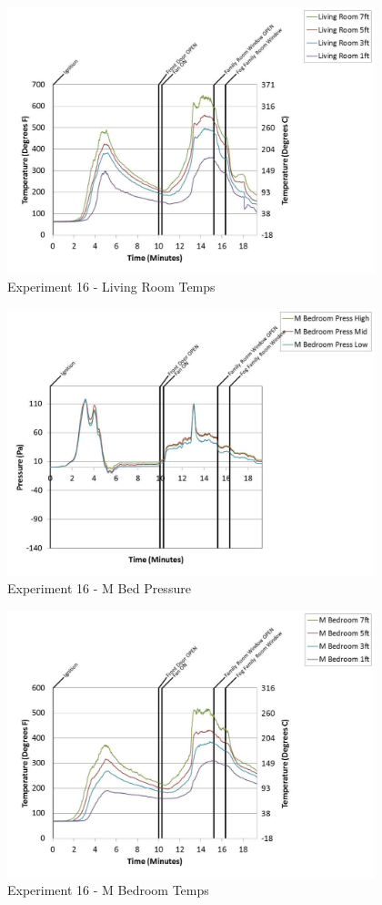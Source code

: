\documentclass{article}
\begin{document}
\begin{appendices}
	\begin{figure}[h!]
		\centering
		\includegraphics[height=3.05in]{0_Images/Results_Charts/Exp_16_Charts/LivingRoomTemps.pdf}
		\caption{Experiment 16 - Living Room Temps}
	\end{figure}
 
	\clearpage

	\begin{figure}[h!]
		\centering
		\includegraphics[height=3.05in]{0_Images/Results_Charts/Exp_16_Charts/MBedPressure.pdf}
		\caption{Experiment 16 - M Bed Pressure}
	\end{figure}
 

	\begin{figure}[h!]
		\centering
		\includegraphics[height=3.05in]{0_Images/Results_Charts/Exp_16_Charts/MBedroomTemps.pdf}
		\caption{Experiment 16 - M Bedroom Temps}
	\end{figure}
 

\end{appendices}
\end{document}
